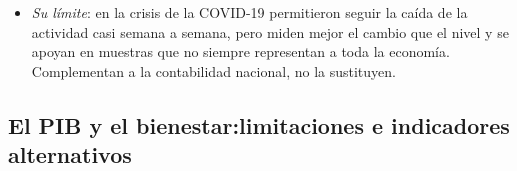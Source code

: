 \documentclass[11pt]{article}
\begin{document}
\begin{itemize}
\begin{itemize}
  \item \emph{Fuentes nuevas}: el IVA que las empresas declaran casi en tiempo real a la Agencia Tributaria, los pagos con tarjeta, las búsquedas en internet, la movilidad y las estadísticas experimentales del INE\nocite{INE2026Experimentales}.
  \item \emph{Modelos}: los modelos factoriales dinámicos combinan indicadores de distinta frecuencia y se actualizan con cada dato nuevo, como el Spain-STING del Banco de España\nocite{CamachoPerezQuiros2011} o el MIPred de la AIReF\nocite{AIReF2026MIPred}.
  \end{itemize}
\item \emph{Su límite}: en la crisis de la COVID-19 permitieron seguir la caída de la actividad casi semana a semana, pero miden mejor el cambio que el nivel y se apoyan en muestras que no siempre representan a toda la economía. Complementan a la contabilidad nacional, no la sustituyen.
\end{itemize}

\subsection{El PIB y el bienestar:\cortetitulo limitaciones e indicadores alternativos}\label{sec:pib-bienestar}
\end{document}
